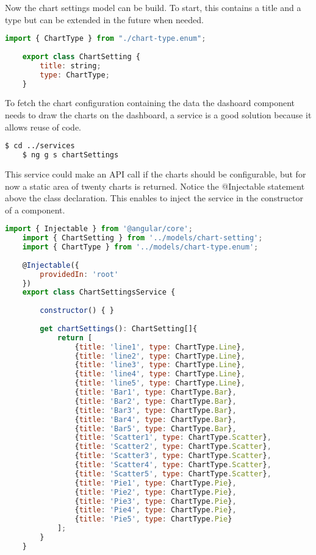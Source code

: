 Now the chart settings model can be build. To start, this contains a title and a type but can be extended in the future when needed.

\begin{lstlisting}[language=JavaScript]
	import { ChartType } from "./chart-type.enum";
	
	export class ChartSetting {
		title: string;
		type: ChartType;
	}
\end{lstlisting}

To fetch the chart configuration containing the data the dashoard component needs to draw the charts on the dashboard, a service is a good solution because it allows reuse of code.
 
\begin{lstlisting}[language=bash]
	$ cd ../services
	$ ng g s chartSettings
\end{lstlisting}

This service could make an API call if the charts should be configurable, but for now a static area of twenty charts is returned. Notice the @Injectable statement above the class declaration. This enables to inject the service in the constructor of a component.

\begin{lstlisting}[language=JavaScript]
	import { Injectable } from '@angular/core';
	import { ChartSetting } from '../models/chart-setting';
	import { ChartType } from '../models/chart-type.enum';
	
	@Injectable({
		providedIn: 'root'
	})
	export class ChartSettingsService {
		
		constructor() { }
		
		get chartSettings(): ChartSetting[]{
			return [
				{title: 'line1', type: ChartType.Line},
				{title: 'line2', type: ChartType.Line},
				{title: 'line3', type: ChartType.Line},
				{title: 'line4', type: ChartType.Line},
				{title: 'line5', type: ChartType.Line},
				{title: 'Bar1', type: ChartType.Bar},
				{title: 'Bar2', type: ChartType.Bar},
				{title: 'Bar3', type: ChartType.Bar},
				{title: 'Bar4', type: ChartType.Bar},
				{title: 'Bar5', type: ChartType.Bar},
				{title: 'Scatter1', type: ChartType.Scatter},
				{title: 'Scatter2', type: ChartType.Scatter},
				{title: 'Scatter3', type: ChartType.Scatter},
				{title: 'Scatter4', type: ChartType.Scatter},
				{title: 'Scatter5', type: ChartType.Scatter},
				{title: 'Pie1', type: ChartType.Pie},
				{title: 'Pie2', type: ChartType.Pie},
				{title: 'Pie3', type: ChartType.Pie},
				{title: 'Pie4', type: ChartType.Pie},
				{title: 'Pie5', type: ChartType.Pie}
			];
		}
	}
\end{lstlisting}

